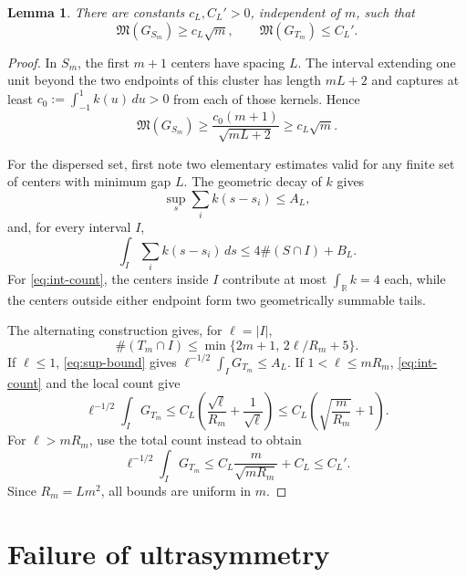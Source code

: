 \documentclass[11pt]{article}
\newtheorem{lemma}{Lemma}
\newcommand{\R}{\mathbb R}
\newcommand{\Mcal}{\mathfrak M}
\begin{document}
\begin{lemma}\label{lem:morrey-separation}
There are constants $c_L,C_L'>0$, independent of $m$, such that
\[
 \Mcal(G_{S_m})\geq c_L\sqrt m,
 \qquad
 \Mcal(G_{T_m})\leq C_L'.
\]
\end{lemma}

\begin{proof}
In $S_m$, the first $m+1$ centers have spacing $L$.  The interval extending
one unit beyond the two endpoints of this cluster has length $mL+2$ and
captures at least
$c_0:=\int_{-1}^1k(u)\,du>0$ from each of those kernels.  Hence
\[
 \Mcal(G_{S_m})
 \geq\frac{c_0(m+1)}{\sqrt{mL+2}}
 \geq c_L\sqrt m.
\]

For the dispersed set, first note two elementary estimates valid for any
finite set of centers with minimum gap $L$.  The geometric decay of $k$
gives
\begin{equation}\label{eq:sup-bound}
 \sup_s\sum_i k(s-s_i)\leq A_L,
\end{equation}
and, for every interval $I$,
\begin{equation}\label{eq:int-count}
 \int_I\sum_i k(s-s_i)\,ds
 \leq4\#(S\cap I)+B_L.
\end{equation}
For \eqref{eq:int-count}, the centers inside $I$ contribute at most
$\int_\R k=4$ each, while the centers outside either endpoint form two
geometrically summable tails.

The alternating construction gives, for $\ell=|I|$,
\[
 \#(T_m\cap I)
 \leq\min\{2m+1,\,2\ell/R_m+5\}.
\]
If $\ell\leq1$, \eqref{eq:sup-bound} gives
$\ell^{-1/2}\int_I G_{T_m}\leq A_L$.  If $1<\ell\leq mR_m$,
\eqref{eq:int-count} and the local count give
\[
 \ell^{-1/2}\int_I G_{T_m}
 \leq C_L\left(\frac{\sqrt\ell}{R_m}+\frac1{\sqrt\ell}\right)
 \leq C_L\left(\sqrt{\frac m{R_m}}+1\right).
\]
For $\ell>mR_m$, use the total count instead to obtain
\[
 \ell^{-1/2}\int_I G_{T_m}
 \leq C_L\frac m{\sqrt{mR_m}}+C_L
 \leq C_L'.
\]
Since $R_m=Lm^2$, all bounds are uniform in $m$.
\end{proof}

\section{Failure of ultrasymmetry}
\end{document}
